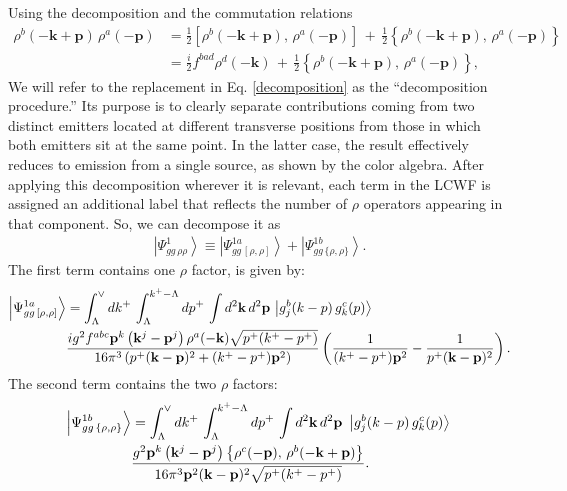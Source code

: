 \documentclass[a4paper,11pt]{article}
\begin{document}
Using the decomposition and the commutation relations
\begin{align}\label{decomposition}
\rho^{b}(-\mathbf{k}+\mathbf{p})\,\rho^{a}(-\mathbf{p}) &= \frac{1}{2}\left[\rho^{b}(-\mathbf{k}+\mathbf{p}),\,\rho^{a}(-\mathbf{p})\right]\,+\,\frac{1}{2}\left\{ \rho^{b}(-\mathbf{k}+\mathbf{p}),\,\rho^{a}(-\mathbf{p})\right\} \\
&= \frac{i}{2}f^{bad}\rho^{d}(-\mathbf{k})\,+\,\frac{1}{2}\left\{ \rho^{b}(-\mathbf{k}+\mathbf{p}),\,\rho^{a}(-\mathbf{p})\right\}, 
\end{align}
We will refer to the replacement in Eq. \eqref{decomposition} as the “decomposition procedure.” Its purpose is to clearly separate contributions coming from two distinct emitters located at different transverse positions from those in which both emitters sit at the same point. In the latter case, the result effectively reduces to emission from a single source, as shown by the color algebra. After applying this decomposition wherever it is relevant, each term in the LCWF is assigned an additional label that reflects the number of $\rho$ operators appearing in that component. So, we can decompose it as 
\begin{align}
\left|\Psi_{gg\,\rho\rho}^{1}\right\rangle \equiv \left|\Psi_{gg\,[\rho,\rho]}^{1a}\right\rangle + \left|\Psi_{gg\,\{\rho,\rho\}}^{1b}\right\rangle.
\end{align}
The first term contains one $\rho$ factor, is given by:
\begin{align}\label{part 1}
\left|\Psi_{gg\,[\rho,\rho]}^{1a}\right\rangle &=\int_{\Lambda}^{\vee}dk^{+}\,\int_{\Lambda}^{k^{+}-\Lambda}dp^{+}\,\int d^{2}\mathbf{k}\, d^{2}\mathbf{p}\,\left|g_{j}^{b}(k-p)\, g_{k}^{c}(p)\right\rangle\,\notag \\ & \frac{ig^{2}f^{abc}\mathbf{p}^{k}\left(\mathbf{k}^{j}-\mathbf{p}^{j}\right)\rho^{a}(-\mathbf{k})\sqrt{p^{+}(k^{+}-p^{+})}}{16\pi^{3}\left(p^{+}(\mathbf{k}-\mathbf{p})^{2}+(k^{+}-p^{+})\mathbf{p}^{2}\right)}  \left(\frac{1}{(k^{+}-p^{+})\mathbf{p}^{2}}-\frac{1}{p^{+}(\mathbf{k}-\mathbf{p})^{2}}\right).
\end{align}
The second term contains the two $\rho$ factors:
\begin{align}\label{part 2}
\left|\Psi_{gg\,\{\rho,\rho\}}^{1b}\right\rangle &= \int_{\Lambda}^{\vee}dk^{+}\,\int_{\Lambda}^{k^{+}-\Lambda}dp^{+}\,\int d^{2}\mathbf{k}\, d^{2}\mathbf{p}\,\,\left|g_{j}^{b}(k-p)\, g_{k}^{c}(p)\right\rangle\,\notag \\ &  \frac{g^{2}\mathbf{p}^{k}\left(\mathbf{k}^{j}-\mathbf{p}^{j}\right)\left\{ \rho^{c}(-\mathbf{p}),\,\rho^{b}(-\mathbf{k}+\mathbf{p})\right\} }{16\pi^{3}\mathbf{p}^{2}(\mathbf{k}-\mathbf{p})^{2}\sqrt{p^{+}(k^{+}-p^{+})}} . 
\end{align}
\end{document}
